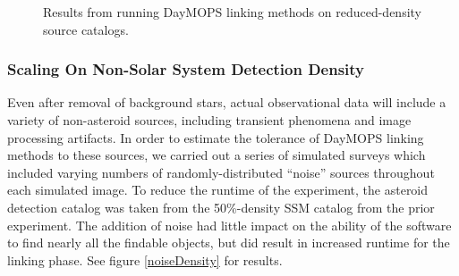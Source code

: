 \documentclass[12pt,preprint]{aastex}
\begin{document}
\begin{figure}


\caption{ Results from running DayMOPS linking methods on reduced-density source catalogs. }

\label{ssmDensity}

\end{figure}














\subsubsection{Scaling On Non-Solar System Detection Density}

Even after removal of background stars, actual observational data will
include a variety of non-asteroid sources, including transient
phenomena and image processing artifacts.  In order to estimate the
tolerance of DayMOPS linking methods to these sources, we carried out
a series of simulated surveys which included varying numbers of
randomly-distributed ``noise'' sources throughout each simulated
image.  To reduce the runtime of the experiment, the asteroid
detection catalog was taken from the 50\%-density SSM catalog from the
prior experiment.  The addition of noise had little impact on the
ability of the software to find nearly all the findable objects, but
did result in increased runtime for the linking phase.  See figure
\ref{noiseDensity} for results.
\end{document}
